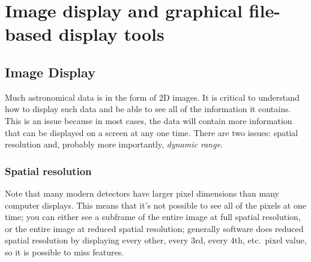 \documentclass{article}
\begin{document}
\section{Image display and graphical file-based display tools}

\subsection*{Image Display}
Much astronomical data is in the form of 2D images. It is critical to
understand how to display such data and be able to see all of the
information it contains. This is an issue because in most cases, the
data will contain more information that can be displayed on a screen
at any one time. There are two issues: spatial resolution and,
probably more importantly, \emph{dynamic range}.


\subsubsection*{Spatial resolution}
Note that many modern detectors have larger pixel dimensions than many
computer displays. This means that it's not possible to see all of the
pixels at one time; you can either see a subframe of the entire image
at full spatial resolution, or the entire image at reduced spatial
resolution; generally software does reduced spatial resolution by
displaying every other, every 3rd, every 4th, etc.\ pixel value, so it
is possible to miss features.
\end{document}
